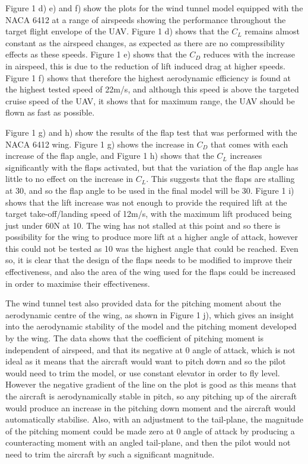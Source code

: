 \documentclass[../../main.tex]{subfiles}
\begin{document}
Figure 1 d) e) and f) show the plots for the wind tunnel model equipped with the NACA 6412 at a range of airspeeds showing the performance throughout the target flight envelope of the UAV.
Figure 1 d) shows that the $C_L$ remains almost constant as the airspeed changes, as expected as there are no compressibility effects as these speeds.
Figure 1 e) shows that the $C_D$ reduces with the increase in airspeed, this is due to the reduction of lift induced drag at higher speeds.
Figure 1 f) shows that therefore the highest aerodynamic efficiency is found at the highest tested speed of 22m/s, and although this speed is above the targeted cruise speed of the UAV, it shows that for maximum range, the UAV should be flown as fast as possible. 

Figure 1 g) and h) show the results of the flap test that was performed with the NACA 6412 wing.
Figure 1 g) shows the increase in $C_D$ that comes with each increase of the flap angle, and Figure 1 h) shows that the $C_L$ increases significantly with the flaps activated, but that the variation of the flap angle has little to no effect on the increase in $C_L$.
This suggests that the flaps are stalling at 30, and so the flap angle to be used in the final model will be 30.
Figure 1 i) shows that the lift increase was not enough to provide the required lift at the target take-off/landing speed of 12m/s, with the maximum lift produced being just under 60N at 10.
The wing has not stalled at this point and so there is possibility for the wing to produce more lift at a higher angle of attack, however this could not be tested as 10 was the highest angle that could be reached.
Even so, it is clear that the design of the flaps needs to be modified to improve their effectiveness, and also the area of the wing used for the flaps could be increased in order to maximise their effectiveness. 

The wind tunnel test also provided data for the pitching moment about the aerodynamic centre of the wing, as shown in Figure 1 j), which gives an insight into the aerodynamic stability of the model and the pitching moment developed by the wing.
The data shows that the coefficient of pitching moment is independent of airspeed, and that its negative at 0 angle of attack, which is not ideal as it means that the aircraft would want to pitch down and so the pilot would need to trim the model, or use constant elevator in order to fly level.
However the negative gradient of the line on the plot is good as this means that the aircraft is aerodynamically stable in pitch, so any pitching up of the aircraft would produce an increase in the pitching down moment and the aircraft would automatically stabilise.
Also, with an adjustment to the tail-plane, the magnitude of the pitching moment could be made zero at 0 angle of attack by producing a counteracting moment with an angled tail-plane, and then the pilot would not need to trim the aircraft by such a significant magnitude. 
\end{document}
